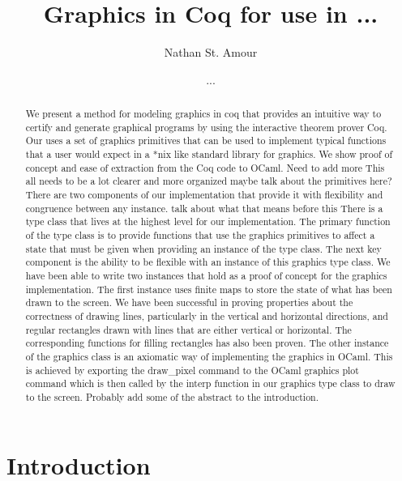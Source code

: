 \documentclass{llncs}
\begin{document}
\title{Graphics in Coq for use in ...}
\author{Nathan St. Amour \and ...}
\maketitle

\begin{abstract}
We present a method for modeling graphics in coq that provides an intuitive way to certify and generate graphical programs by using the interactive
theorem prover Coq.  Our uses a set of graphics primitives that can be used to implement typical functions that a user would expect in a *nix like
standard library for graphics.  We show proof of concept and ease of extraction from the Coq code to OCaml. {\color{red} Need to add more}
{\color{red} This all needs to be a lot clearer and more organized maybe talk about the primitives here?} There are two components of our implementation that provide it with flexibility and congruence between any instance. {\color{red}talk about what that means before this} There is a type class that lives at the highest level for our implementation.  The primary function of the type class is to provide functions that use the graphics
primitives to affect a state that must be given when providing an instance of the type class. The next key component is the ability to be flexible with an instance of this graphics type class.  We have been able to write two instances that hold as a proof of concept for the graphics implementation.  The first instance uses finite maps to store the state of what has been drawn to the screen.  We have been successful in proving properties
about the correctness of drawing lines, particularly in the vertical and horizontal directions, and regular rectangles drawn with lines that are
either vertical or horizontal.  The corresponding functions for filling rectangles has also been proven.  The other instance of the graphics class is an axiomatic way of implementing the graphics in OCaml.  This is achieved by exporting the draw\_pixel command to the OCaml graphics plot command which is then called by the interp function in our graphics type class to draw to the screen.  {\color{red}Probably add some of the abstract
  to the introduction.}
\end{abstract}
\tableofcontents
\newpage

\section{Introduction}
\end{document}
